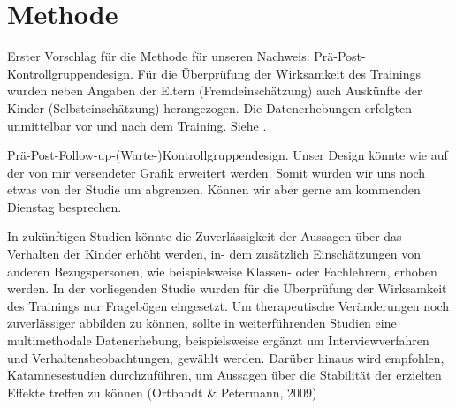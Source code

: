 %
%
\chapter{Methode}\label{chap.methode}
\glsresetall
Erster Vorschlag für die Methode für unseren Nachweis:\newline
Prä-Post-Kontrollgruppendesign. 
Für die Überprüfung der Wirksamkeit des Trainings wurden neben Angaben der Eltern (Fremdeinschätzung) auch Auskünfte der Kinder (Selbsteinschätzung) herangezogen. Die Datenerhebungen erfolgten unmittelbar vor und nach dem Training. 
Siehe .

Prä-Post-Follow-up-(Warte-)Kontrollgruppendesign. Unser Design könnte wie auf der von mir versendeter Grafik erweitert werden. Somit würden wir uns noch etwas von der Studie um  abgrenzen. Können wir aber gerne am kommenden Dienstag besprechen.

In zukünftigen Studien könnte die Zuverlässigkeit der Aussagen über das Verhalten der Kinder erhöht werden, in- dem zusätzlich Einschätzungen von anderen Bezugspersonen, wie beispielsweise Klassen- oder Fachlehrern, erhoben werden. In der vorliegenden Studie wurden für die Überprüfung der Wirksamkeit des Trainings nur Fragebögen eingesetzt. Um therapeutische Veränderungen noch zuverlässiger abbilden zu können, sollte in weiterführenden Studien eine multimethodale Datenerhebung, beispielsweise ergänzt um Interviewverfahren und Verhaltensbeobachtungen, gewählt werden. Darüber hinaus wird empfohlen, Katamnesestudien durchzuführen, um Aussagen über die Stabilität der erzielten Effekte treffen zu können (Ortbandt \& Petermann, 2009)
